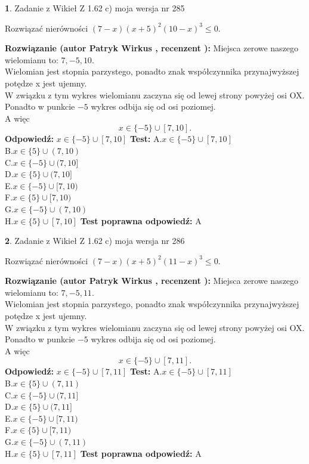 \documentclass[12pt, a4paper]{article}
\theoremstyle{definition} %
\newtheorem{zad}{}
\newcommand{\zadStart}[1]{\begin{zad}#1\newline}
\newcommand{\zadStop}{\end{zad}}
\newcommand{\rozwStart}[2]{\noindent \textbf{Rozwiązanie (autor #1 , recenzent #2): }\newline}
\newcommand{\rozwStop}{\newline}
\newcommand{\odpStart}{\noindent \textbf{Odpowiedź:}\newline}
\newcommand{\odpStop}{\newline}
\newcommand{\testStart}{\noindent \textbf{Test:}\newline}
\newcommand{\testStop}{\newline}
\newcommand{\kluczStart}{\noindent \textbf{Test poprawna odpowiedź:}\newline}
\newcommand{\kluczStop}{\newline}
\begin{document}
\zadStart{Zadanie z Wikieł Z 1.62 c) moja wersja nr 285}

Rozwiązać nierówności $(7-x)(x+5)^{2}(10-x)^{3}\le0$.
\zadStop
\rozwStart{Patryk Wirkus}{}
Miejsca zerowe naszego wielomianu to: $7, -5, 10$.\\
Wielomian jest stopnia parzystego, ponadto znak współczynnika przy\linebreak najwyższej potędze x jest ujemny.\\ W związku z tym wykres wielomianu zaczyna się od lewej strony powyżej osi OX.\\
Ponadto w punkcie $-5$ wykres odbija się od osi poziomej.\\
A więc $$x \in \{-5\} \cup [7,10].$$
\rozwStop
\odpStart
$x \in \{-5\} \cup [7,10]$
\odpStop
\testStart
A.$x \in \{-5\} \cup [7,10]$\\
B.$x \in \{5\} \cup (7,10)$\\
C.$x \in \{-5\} \cup (7,10]$\\
D.$x \in \{5\} \cup (7,10]$\\
E.$x \in \{-5\} \cup [7,10)$\\
F.$x \in \{5\} \cup [7,10)$\\
G.$x \in \{-5\} \cup (7,10)$\\
H.$x \in \{5\} \cup [7,10]$
\testStop
\kluczStart
A
\kluczStop



\zadStart{Zadanie z Wikieł Z 1.62 c) moja wersja nr 286}

Rozwiązać nierówności $(7-x)(x+5)^{2}(11-x)^{3}\le0$.
\zadStop
\rozwStart{Patryk Wirkus}{}
Miejsca zerowe naszego wielomianu to: $7, -5, 11$.\\
Wielomian jest stopnia parzystego, ponadto znak współczynnika przy\linebreak najwyższej potędze x jest ujemny.\\ W związku z tym wykres wielomianu zaczyna się od lewej strony powyżej osi OX.\\
Ponadto w punkcie $-5$ wykres odbija się od osi poziomej.\\
A więc $$x \in \{-5\} \cup [7,11].$$
\rozwStop
\odpStart
$x \in \{-5\} \cup [7,11]$
\odpStop
\testStart
A.$x \in \{-5\} \cup [7,11]$\\
B.$x \in \{5\} \cup (7,11)$\\
C.$x \in \{-5\} \cup (7,11]$\\
D.$x \in \{5\} \cup (7,11]$\\
E.$x \in \{-5\} \cup [7,11)$\\
F.$x \in \{5\} \cup [7,11)$\\
G.$x \in \{-5\} \cup (7,11)$\\
H.$x \in \{5\} \cup [7,11]$
\testStop
\kluczStart
A
\kluczStop
\end{document}
